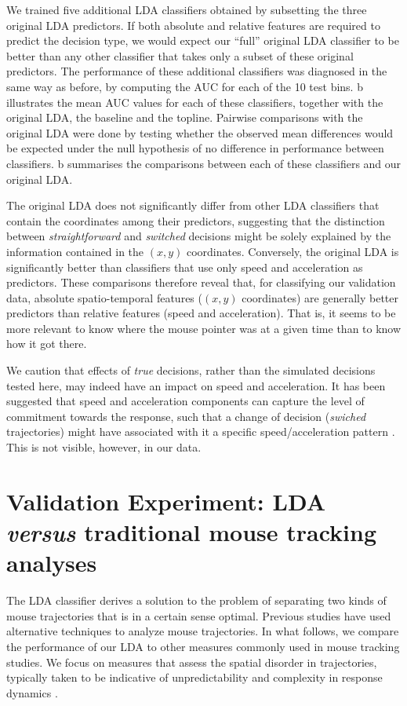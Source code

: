 \documentclass[11pt]{article}
\begin{document}
We trained five additional LDA classifiers obtained by subsetting the three original LDA predictors. If both absolute and relative features are required to predict the decision type, we would expect our ``full'' original LDA classifier to be better than any other classifier that takes only a subset of these original predictors. 
The performance of these additional classifiers was diagnosed in the same way as before, by computing the AUC for each of the 10 test bins. b illustrates the mean AUC values for each of these classifiers, together with the original LDA, the baseline and the topline. 
Pairwise comparisons with the original LDA were done by testing whether the observed mean differences would be expected under the null hypothesis of no difference in performance between classifiers. b summarises the comparisons between each of these classifiers and our original LDA. 	

The original LDA does not significantly differ from other LDA classifiers that contain the coordinates among their predictors, suggesting that the distinction between \emph{straightforward} and \emph{switched} decisions might be solely explained by the information contained in the $(x,y)$ coordinates. 
Conversely, the original LDA is significantly better than classifiers that use only speed and acceleration as predictors. These comparisons therefore reveal that, for classifying our validation data, absolute spatio-temporal features ($(x,y)$ coordinates) are generally better predictors than relative features (speed and acceleration). That is, it seems to be more relevant to know where the mouse pointer was at a given time than to know how it got there. 

We caution that effects of \emph{true} decisions, rather than the simulated decisions tested here, may indeed have an impact on speed and acceleration. It has been suggested that speed and acceleration components can capture the level of commitment towards the response, such that a change of decision (\textit{swiched} trajectories) might have associated with it a specific speed/acceleration pattern \citep{Hehman2014}. This is not visible, however, in our data.


\section{Validation Experiment: LDA \emph{versus} traditional mouse tracking analyses}
\label{section:other-mt}
The LDA classifier derives a solution to the problem of separating two kinds of mouse trajectories that is in a certain sense optimal. Previous studies have used alternative techniques to analyze mouse trajectories. In what follows, we  compare the performance of our LDA to other measures commonly used in mouse tracking studies. We focus on measures that assess the spatial disorder in trajectories, typically taken to be indicative of unpredictability and complexity in response dynamics \citep{Hehman2014}.
\end{document}
